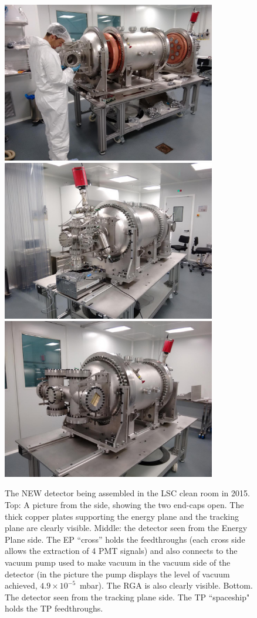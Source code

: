\begin{figure}[hpt!]
\centering
\includegraphics[height=7cm]{img2/NewInCRWIthAlberto.png}
\includegraphics[height=7cm]{img2/NewSeenFromEP.png}
\includegraphics[height=7cm]{img2/NewSeenFromTP.png}

\caption{The NEW detector being assembled in the LSC clean room in 2015. Top: A picture from the side, showing the two end-caps open. The thick copper plates supporting the energy plane and the tracking plane are clearly visible. Middle: the detector seen from the Energy Plane side. The EP ``cross'' holds the feedthroughs (each cross side allows the extraction of 4 PMT signals) and also connects to the vacuum pump used to make vacuum in the vacuum side of the detector (in the picture the pump displays the level of vacuum achieved, $4.9 \times 10^{-5}$~mbar). The RGA is also clearly visible. Bottom. The detector seen from the tracking plane side. The TP ``spaceship" holds the TP feedthroughs.} \label{fig.New}
\end{figure}


